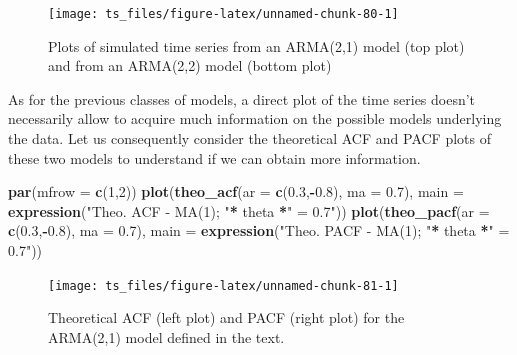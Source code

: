 \documentclass[]{book}
\newenvironment{Shaded}{\begin{snugshade}}{\end{snugshade}}
\newcommand{\KeywordTok}[1]{\textcolor[rgb]{0.13,0.29,0.53}{\textbf{#1}}}
\newcommand{\DataTypeTok}[1]{\textcolor[rgb]{0.13,0.29,0.53}{#1}}
\newcommand{\DecValTok}[1]{\textcolor[rgb]{0.00,0.00,0.81}{#1}}
\newcommand{\FloatTok}[1]{\textcolor[rgb]{0.00,0.00,0.81}{#1}}
\newcommand{\StringTok}[1]{\textcolor[rgb]{0.31,0.60,0.02}{#1}}
\newcommand{\OperatorTok}[1]{\textcolor[rgb]{0.81,0.36,0.00}{\textbf{#1}}}
\newcommand{\NormalTok}[1]{#1}
\theoremstyle{definition}
\theoremstyle{definition}
\theoremstyle{definition}
\theoremstyle{remark}
\begin{document}
\begin{figure}

{\centering \texttt{[image: ts\_files/figure-latex/unnamed-chunk-80-1]} 

}

\caption{Plots of simulated time series from an ARMA(2,1) model (top plot) and from an ARMA(2,2) model (bottom plot)}\label{fig:unnamed-chunk-80}
\end{figure}

As for the previous classes of models, a direct plot of the time series
doesn't necessarily allow to acquire much information on the possible
models underlying the data. Let us consequently consider the theoretical
ACF and PACF plots of these two models to understand if we can obtain
more information.

\begin{Shaded}
\begin{Highlighting}[]
\KeywordTok{par}\NormalTok{(}\DataTypeTok{mfrow =} \KeywordTok{c}\NormalTok{(}\DecValTok{1}\NormalTok{,}\DecValTok{2}\NormalTok{))}
\KeywordTok{plot}\NormalTok{(}\KeywordTok{theo_acf}\NormalTok{(}\DataTypeTok{ar =} \KeywordTok{c}\NormalTok{(}\FloatTok{0.3}\NormalTok{,}\OperatorTok{-}\FloatTok{0.8}\NormalTok{), }\DataTypeTok{ma =} \FloatTok{0.7}\NormalTok{), }\DataTypeTok{main =} \KeywordTok{expression}\NormalTok{(}\StringTok{"Theo. ACF - MA(1); "}\OperatorTok{*}\StringTok{ }\NormalTok{theta }\OperatorTok{*}\StringTok{" = 0.7"}\NormalTok{))}
\KeywordTok{plot}\NormalTok{(}\KeywordTok{theo_pacf}\NormalTok{(}\DataTypeTok{ar =} \KeywordTok{c}\NormalTok{(}\FloatTok{0.3}\NormalTok{,}\OperatorTok{-}\FloatTok{0.8}\NormalTok{), }\DataTypeTok{ma =} \FloatTok{0.7}\NormalTok{), }\DataTypeTok{main =} \KeywordTok{expression}\NormalTok{(}\StringTok{"Theo. PACF - MA(1); "}\OperatorTok{*}\StringTok{ }\NormalTok{theta }\OperatorTok{*}\StringTok{" = 0.7"}\NormalTok{))}
\end{Highlighting}
\end{Shaded}

\begin{figure}

{\centering \texttt{[image: ts\_files/figure-latex/unnamed-chunk-81-1]} 

}

\caption{Theoretical ACF (left plot) and PACF (right plot) for the ARMA(2,1) model defined in the text.}\label{fig:unnamed-chunk-81}
\end{figure}
\end{document}
